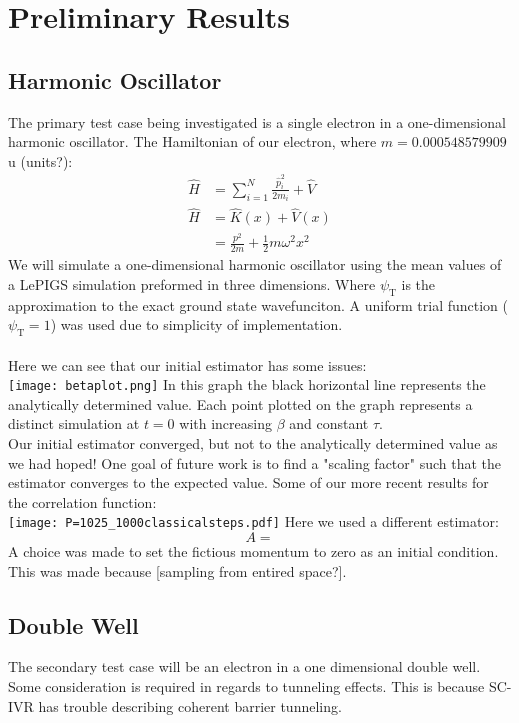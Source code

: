 \documentclass[12pt,letterpaper,oneside,final,titlepage]{article}               %
\numberwithin{equation}{section} %
\newcommand{\psiT}{\psi_{\textrm{T}}}
\begin{document}
\section{Preliminary Results}

\subsection*{Harmonic Oscillator}
The primary test case being investigated is a single electron in a one-dimensional harmonic oscillator. 
The Hamiltonian of our electron, where $m = \num{0.000548579909}$u (units?): 
\begin{align}
    \hat{H} &= \sum_{i=1}^{N}\frac{\hat{p}_{i}^2}{2m_{i}} + \hat{V} \\
    \hat{H} &= \hat{K}(x) + \hat{V}(x) \\
            &= \frac{p^2}{2m} + \frac{1}{2} m \omega^{2} x^{2} 
\end{align}
We will simulate a one-dimensional harmonic oscillator using the mean values of a LePIGS simulation preformed in three dimensions. 
Where $\psiT$ is the approximation to the exact ground state wavefunciton. 
A uniform trial function ($\psiT = 1$) was used due to simplicity of implementation. \\ \\
Here we can see that our initial estimator has some issues:\\
\texttt{[image: betaplot.png]}
In this graph the black horizontal line represents the analytically determined value.
Each point plotted on the graph represents a distinct simulation at $t=0$ with increasing $\beta$ and constant $\tau$.\\
Our initial estimator converged, but not to the analytically determined value as we had hoped! 
One goal of future work is to find a "scaling factor" such that the estimator converges to the expected value.
Some of our more recent results for the correlation function:\\
\texttt{[image: P=1025\_1000classicalsteps.pdf]}
Here we used a different estimator:
\begin{equation}
    A = 
\end{equation}
A choice was made to set the fictious momentum to zero as an initial condition. This was made because [sampling from entired space?].

\subsection*{Double Well}
The secondary test case will be an electron in a one dimensional double well. 
Some consideration is required in regards to tunneling effects. 
This is because SC-IVR has trouble describing coherent barrier tunneling.
\end{document}
